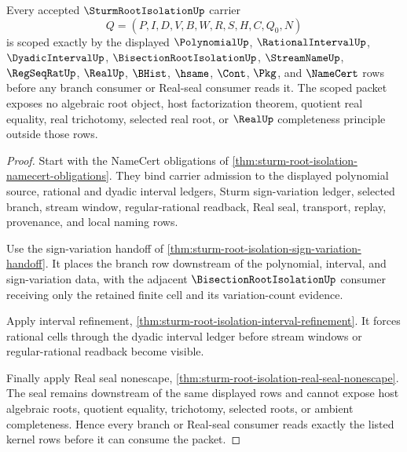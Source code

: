 \begin{theorem}
\label{thm:sturm-root-isolation-scoped-kernel-binding}
Every accepted $\SturmRootIsolationUp$ carrier
$$
Q=(P,I,D,V,B,W,R,S,H,C,Q_0,N)
$$
is scoped exactly by the displayed $\PolynomialUp$, $\RationalIntervalUp$, $\DyadicIntervalUp$, $\BisectionRootIsolationUp$, $\StreamNameUp$, $\RegSeqRatUp$, $\RealUp$, $\BHist$, $\hsame$, $\Cont$, $\Pkg$, and $\NameCert$ rows before any branch consumer or Real-seal consumer reads it. The scoped packet exposes no algebraic root object, host factorization theorem, quotient real equality, real trichotomy, selected real root, or $\RealUp$ completeness principle outside those rows.
\end{theorem}
\begin{proof}
Start with the NameCert obligations of \autoref{thm:sturm-root-isolation-namecert-obligations}. They bind carrier admission to the displayed polynomial source, rational and dyadic interval ledgers, Sturm sign-variation ledger, selected branch, stream window, regular-rational readback, Real seal, transport, replay, provenance, and local naming rows.

Use the sign-variation handoff of \autoref{thm:sturm-root-isolation-sign-variation-handoff}. It places the branch row downstream of the polynomial, interval, and sign-variation data, with the adjacent $\BisectionRootIsolationUp$ consumer receiving only the retained finite cell and its variation-count evidence.

Apply interval refinement, \autoref{thm:sturm-root-isolation-interval-refinement}. It forces rational cells through the dyadic interval ledger before stream windows or regular-rational readback become visible.

Finally apply Real seal nonescape, \autoref{thm:sturm-root-isolation-real-seal-nonescape}. The seal remains downstream of the same displayed rows and cannot expose host algebraic roots, quotient equality, trichotomy, selected roots, or ambient completeness. Hence every branch or Real-seal consumer reads exactly the listed kernel rows before it can consume the packet.
\end{proof}

